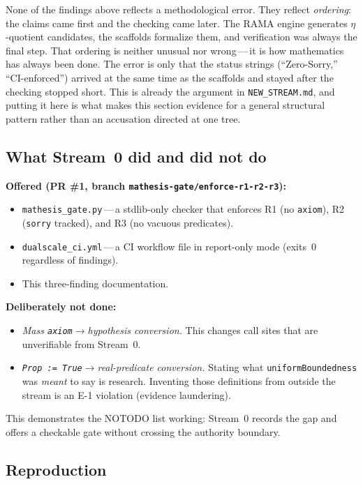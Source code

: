 None of the findings above reflects a methodological error.
They reflect \emph{ordering}: the claims came first and the checking came
later.
The RAMA engine generates $\eta$-quotient candidates, the scaffolds
formalize them, and verification was always the final step.
That ordering is neither unusual nor wrong\,---\,it is how mathematics
has always been done.
The error is only that the status strings (``Zero-Sorry,'' ``CI-enforced'')
arrived at the same time as the scaffolds and stayed after the checking
stopped short.
This is already the argument in \texttt{NEW\_STREAM.md}, and putting it
here is what makes this section evidence for a general structural pattern
rather than an accusation directed at one tree.

\subsection*{What Stream~0 did and did not do}

\textbf{Offered (PR \#1, branch \texttt{mathesis-gate/enforce-r1-r2-r3}):}
\begin{itemize}
  \item \texttt{mathesis\_gate.py}\,---\,a stdlib-only checker that
    enforces R1 (no \texttt{axiom}), R2 (\texttt{sorry} tracked), and
    R3 (no vacuous predicates).
  \item \texttt{dualscale\_ci.yml}\,---\,a CI workflow file in
    report-only mode (exits~0 regardless of findings).
  \item This three-finding documentation.
\end{itemize}

\noindent
\textbf{Deliberately not done:}
\begin{itemize}
  \item \emph{Mass \texttt{axiom}$\to$hypothesis conversion.}
    This changes call sites that are unverifiable from Stream~0.
  \item \emph{\texttt{Prop := True}$\to$real-predicate conversion.}
    Stating what \texttt{uniformBoundedness} was \emph{meant} to say is
    research.
    Inventing those definitions from outside the stream is an E-1
    violation (evidence laundering).
\end{itemize}

\noindent
This demonstrates the NOTODO list working: Stream~0 records the gap
and offers a checkable gate without crossing the authority boundary.

\subsection*{Reproduction}

